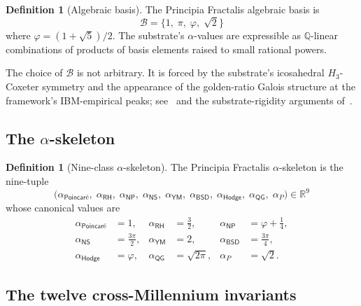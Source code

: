 \documentclass[11pt,a4paper]{amsart}
\theoremstyle{plain}
\theoremstyle{definition}
\newtheorem{definition}[theorem]{Definition}
\begin{document}
\begin{definition}[Algebraic basis]\label{def:basis}
The Principia Fractalis algebraic basis is
\[
\mathcal{B} = \{1,\;\pi,\;\varphi,\;\sqrt{2}\}
\]
where $\varphi = (1+\sqrt{5})/2$. The substrate's $\alpha$-values are expressible as $\mathbb{Q}$-linear combinations of products of basis elements raised to small rational powers.
\end{definition}

The choice of $\mathcal{B}$ is not arbitrary. It is forced by the substrate's icosahedral $H_3$-Coxeter symmetry and the appearance of the golden-ratio Galois structure at the framework's IBM-empirical peaks; see~\cite[Chapter~9]{cohen2026book} and the substrate-rigidity arguments of~\cite{cohen2026bulletproof}.

\subsection{The \texorpdfstring{$\alpha$-skeleton}{alpha-skeleton}}\label{subsec:alpha-skeleton}

\begin{definition}[Nine-class $\alpha$-skeleton]\label{def:alpha-skeleton}
The Principia Fractalis $\alpha$-skeleton is the nine-tuple
\[
\bigl(\alpha_{\textsf{Poincar\'e}},\;\alpha_{\textsf{RH}},\;\alpha_{\textsf{NP}},\;\alpha_{\textsf{NS}},\;\alpha_{\textsf{YM}},\;\alpha_{\textsf{BSD}},\;\alpha_{\textsf{Hodge}},\;\alpha_{\textsf{QG}},\;\alpha_{P}\bigr) \in \mathbb{R}^9
\]
whose canonical values are
\[
\begin{aligned}
\alpha_{\textsf{Poincar\'e}} &= 1, &
\alpha_{\textsf{RH}} &= \tfrac{3}{2}, &
\alpha_{\textsf{NP}} &= \varphi + \tfrac{1}{4},\\
\alpha_{\textsf{NS}} &= \tfrac{3\pi}{2}, &
\alpha_{\textsf{YM}} &= 2, &
\alpha_{\textsf{BSD}} &= \tfrac{3\pi}{4},\\
\alpha_{\textsf{Hodge}} &= \varphi, &
\alpha_{\textsf{QG}} &= \sqrt{2\pi}, &
\alpha_{P} &= \sqrt{2}.
\end{aligned}
\]
\end{definition}

\subsection{The twelve cross-Millennium invariants}
\end{document}
